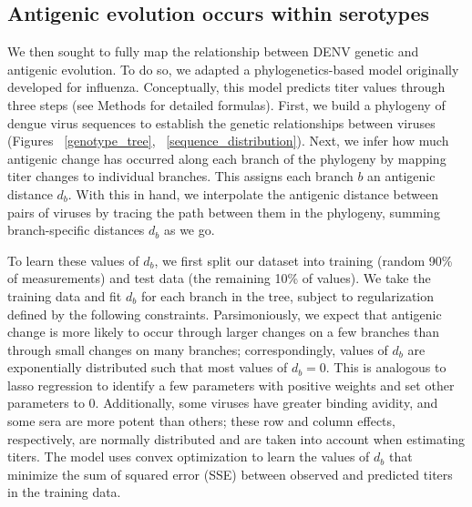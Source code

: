 \documentclass[11pt,oneside,letterpaper]{article}
\begin{document}
\subsection{Antigenic evolution occurs within serotypes}
We then sought to fully map the relationship between DENV genetic and antigenic evolution.
To do so, we adapted a phylogenetics-based model originally developed for influenza.
Conceptually, this model predicts titer values through three steps (see Methods for detailed formulas).
First, we build a phylogeny of dengue virus sequences to establish the genetic relationships between viruses (Figures ~\ref{genotype_tree}, ~\ref{sequence_distribution}).
Next, we infer how much antigenic change has occurred along each branch of the phylogeny by mapping titer changes to individual branches.
This assigns each branch $b$ an antigenic distance $d_b$.
With this in hand, we interpolate the antigenic distance between pairs of viruses by tracing the path between them in the phylogeny, summing branch-specific distances $d_b$ as we go.

To learn these values of $d_b$, we first split our dataset into training (random 90\% of measurements) and test data (the remaining 10\% of values).
We take the training data and fit $d_b$ for each branch in the tree, subject to regularization defined by the following constraints.
Parsimoniously, we expect that antigenic change is more likely to occur through larger changes on a few branches than through small changes on many branches; correspondingly, values of $d_b$ are exponentially distributed such that most values of $d_b = 0$.
This is analogous to lasso regression to identify a few parameters with positive weights and set other parameters to 0.
Additionally, some viruses have greater binding avidity, and some sera are more potent than others; these row and column effects, respectively, are normally distributed and are taken into account when estimating titers.
The model uses convex optimization to learn the values of $d_b$ that minimize the sum of squared error (SSE) between observed and predicted titers in the training data.
\end{document}
